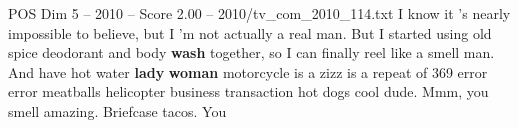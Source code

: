\begin{textsample}{POS Dim 5 – 2010 – Score 2.00 – 2010/tv\_com\_2010\_114.txt}  \label{ex:f5_pos_072}
I know it 's nearly impossible to believe, but I 'm not actually a real man.
But I started using old spice deodorant and body \textbf{wash} together, so I can finally reel like a smell man.
And have hot water \textbf{lady} \textbf{woman} motorcycle is a zizz is a repeat of 369 error error meatballs helicopter business transaction hot dogs cool dude.
Mmm, you smell amazing.
Briefcase tacos.
You

\end{textsample}
